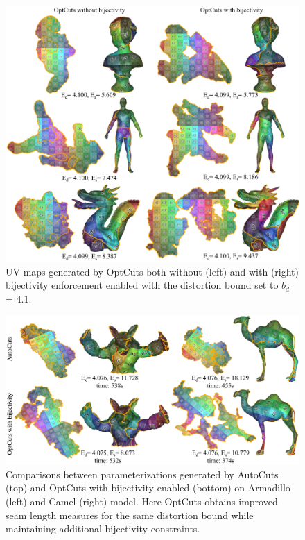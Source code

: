 %
\begin{figure}[t]
\centering
\includegraphics[width=\linewidth]{fig/our_impressive_results_right.png}
\vspace{-0.3cm}
\caption{UV maps generated by OptCuts both without (left) and with (right) bijectivity enforcement enabled with the distortion bound set to $b_d$ = $4.1$.}
\vspace{-0.3cm}
\label{fig:our_impressive_results}
\end{figure}


\begin{figure}[tb]
\centering
\includegraphics[width=\linewidth]{fig/comp_AutoCuts.png}
\vspace{-0.3cm}
\caption{Comparisons between parameterizations generated by AutoCuts (top) and OptCuts with bijectivity enabled (bottom) on Armadillo (left) and Camel (right) model. Here OptCuts obtains improved  seam length measures for the same distortion bound while maintaining additional bijectivity constraints.}
\vspace{-0.3cm}
\label{fig:comp_AutoCuts}
\end{figure}



